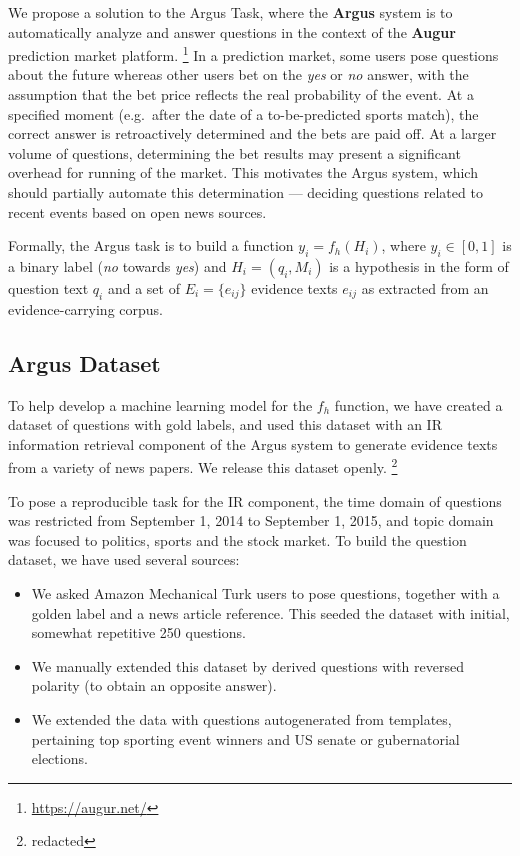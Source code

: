 \documentclass[11pt]{article}
\begin{document}
We propose a solution to the Argus Task, where
the \textbf{Argus} system \cite{arguswp} \cite{argus}
is to automatically analyze and answer questions
in the context of the \textbf{Augur} prediction market platform.%
\footnote{\url{https://augur.net/}}
In a prediction market, some users pose questions about the future
whereas other users bet on the \textit{yes} or \textit{no} answer,
with the assumption that the bet price reflects the real probability
of the event.  At a specified moment (e.g.\ after the date of a to-be-predicted sports match), the
correct answer is retroactively determined and the bets are paid off.
At a larger volume of questions, determining the bet results may
present a significant overhead for running of the market.
This motivates the Argus system, which should partially automate
this determination --- deciding questions related to recent events
based on open news sources.

Formally, the Argus task is to build a function $y_i = f_h(H_i)$,
where $y_i \in [0,1]$ is a binary label (\textit{no} towards \textit{yes})
and $H_i = (q_i, M_i)$ is a hypothesis in the form of question text $q_i$
and a set of $E_i = \{e_{ij}\}$ evidence texts $e_{ij}$ as extracted
from an evidence-carrying corpus.



\subsection{Argus Dataset}

To help develop a machine learning model for the $f_h$ function,
we have created a dataset of questions with gold labels, and used
this dataset with an IR information retrieval component of the Argus
system to generate evidence texts from a variety of news papers.
We release this dataset openly.%
\footnote{redacted}

To pose a reproducible task for the IR component, the time domain
of questions was restricted from September 1, 2014 to September 1, 2015,
and topic domain was focused to politics, sports and the stock market.
To build the question dataset, we have used several sources:
\begin{itemize}
	\item We asked Amazon Mechanical Turk users to pose questions, together with a golden label and a news article reference.
		This seeded the dataset with initial, somewhat repetitive 250 questions.
	\item We manually extended this dataset by derived questions with reversed polarity (to obtain an opposite answer).
	\item We extended the data with questions autogenerated from templates, pertaining top sporting event winners and US senate or gubernatorial elections.
\end{itemize}
\end{document}
